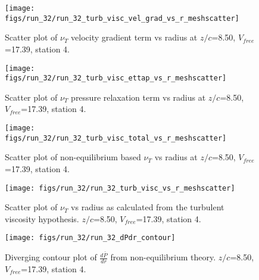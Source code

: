 \begin{figure}[H]
\centering
\texttt{[image: figs/run\_32/run\_32\_turb\_visc\_vel\_grad\_vs\_r\_meshscatter]}
\caption{Scatter plot of $\nu_T$ velocity gradient term vs radius at $z/c$=8.50, $V_{free}$=17.39, station 4.}
\end{figure}


\begin{figure}[H]
\centering
\texttt{[image: figs/run\_32/run\_32\_turb\_visc\_ettap\_vs\_r\_meshscatter]}
\caption{Scatter plot of $\nu_T$ pressure relaxation term vs radius at $z/c$=8.50, $V_{free}$=17.39, station 4.}
\end{figure}


\begin{figure}[H]
\centering
\texttt{[image: figs/run\_32/run\_32\_turb\_visc\_total\_vs\_r\_meshscatter]}
\caption{Scatter plot of non-equilibrium based $\nu_T$ vs radius at $z/c$=8.50, $V_{free}$=17.39, station 4.}
\end{figure}


\begin{figure}[H]
\centering
\texttt{[image: figs/run\_32/run\_32\_turb\_visc\_vs\_r\_meshscatter]}
\caption{Scatter plot of $\nu_T$ vs radius as calculated from the turbulent viscosity hypothesis. $z/c$=8.50, $V_{free}$=17.39, station 4.}
\end{figure}


\begin{figure}[H]
\centering
\texttt{[image: figs/run\_32/run\_32\_dPdr\_contour]}
\caption{Diverging contour plot of $\frac{d\bar{P}}{dr}$ from non-equilibrium theory. $z/c$=8.50, $V_{free}$=17.39, station 4.}
\end{figure}


